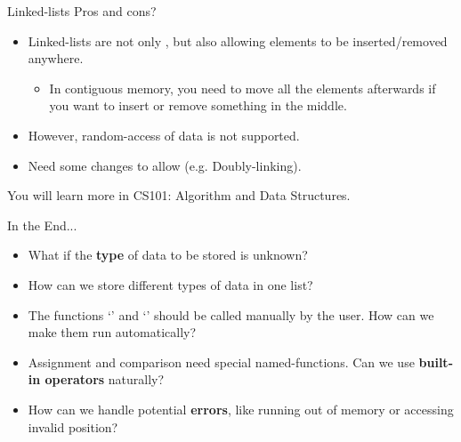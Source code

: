 \documentclass{beamer}
\begin{document}
\begin{frame}[fragile]{Linked-lists}
    Pros and cons?
    \pause
    \begin{itemize}
        \item Linked-lists are not only , but also allowing elements to be inserted/removed anywhere.
        \begin{itemize}
            \item In contiguous memory, you need to move all the elements afterwards if you want to insert or remove something in the middle.
        \end{itemize}
        \pause
        \item However, random-access of data is not supported.
        \pause
        \item Need some changes to allow  (e.g. Doubly-linking).
    \end{itemize}
    \pause
    You will learn more in CS101: Algorithm and Data Structures.
\end{frame}

\begin{frame}{In the End...}
    \begin{itemize}
        \item What if the \textbf{type} of data to be stored is unknown?
        \item How can we store different types of data in one list?
        \item The functions `' and `' should be called manually by the user. How can we make them run automatically?
        \item Assignment and comparison need special named-functions. Can we use \textbf{built-in operators} naturally?
        \item How can we handle potential \textbf{errors}, like running out of memory or accessing invalid position?
    \end{itemize}
    \pause
\end{frame}
\end{document}
